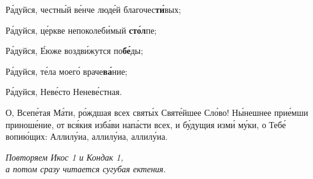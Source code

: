 \begin{russian}

  Ра́дуйся, честны́й ве́нче люде́й благочес\textbf{ти́}вых;


  Ра́дуйся, це́ркве непоколеби́мый \textbf{сто́л}пе;


  Ра́дуйся, Е́юже воздви́жутся по\textbf{бе́}ды;


  Ра́дуйся, те́ла моего́ враче\textbf{ва́}ние;


  Ра́дуйся, Неве́сто Неневе́стная.


  О, Всепе́тая Ма́ти, ро́ждшая всех святы́х Святе́йшее Сло́во! Ны́нешнее прие́мши приноше́ние, от вся́кия изба́ви напа́сти всех, и бу́дущия изми́ му́ки, о Тебе́ вопию́щих: Аллилу́иа, аллилу́иа, аллилу́иа. \Trizhdy

\begin{center}
  \begin{russian}
    {\color{Maroon}\emph{Повторяем Икос 1 и Кондак 1,\\а потом сразу читается сугубая ектения.}}
  \end{russian}
\end{center}

\end{russian}

\pagebreak

\begin{center}
  {\color{Maroon}{\large Prayer Following Akathist}}
\end{center}

